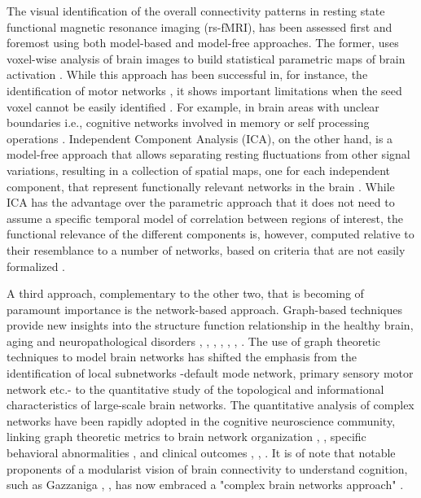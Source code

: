 \documentclass[12pt,a4paper]{article}
\begin{document}
The visual identification of the
overall connectivity patterns in resting state functional magnetic resonance
imaging (rs-fMRI), has been assessed first and foremost using both model-based and model-free
approaches. The former, uses voxel-wise analysis of brain images to build statistical parametric maps of brain activation \cite{biswal_functional_1995}. 
While this approach has been successful in, for instance, 
the identification of motor networks \cite{robinson_resting_2009}, it shows important limitations when
the seed voxel cannot be easily identified \cite{maldjian_functional_2001}.  
For example, in brain areas with unclear boundaries i.e., cognitive networks involved in memory or self processing operations \cite{fingelkurts_persistent_2011}. 
Independent Component Analysis (ICA), on
the other hand, is a model-free approach that allows separating resting
fluctuations from other signal variations, resulting in a collection of spatial
maps, one for each independent component, that represent functionally relevant networks in the brain
\cite{calhoun_review_2009}.
While ICA has the advantage over the parametric approach that it does not need to
assume a specific temporal model of correlation between regions of
interest, the functional relevance of the different components is, however,
computed relative to their resemblance to a number of networks, based on
criteria that are not easily formalized \cite{biswal_toward_2010}.

A third approach, complementary to the other two, that is becoming of paramount importance is the network-based approach. Graph-based techniques provide new
insights into the structure function relationship in the healthy brain, aging and neuropathological disorders \cite{fair_functional_2009}, 
\cite{wang_graph-based_2010}, \cite{he_graph_2010}, \cite{wang_graph_2011}, \cite{yu_altered_2011}, \cite{brier_functional_2014}, \cite{sala-llonch_changes_2014}. 
The use of graph theoretic techniques to model brain networks has shifted the 
emphasis from the identification of local subnetworks -default mode network,
primary sensory motor network etc.- to the quantitative study of the topological
and informational characteristics of large-scale brain networks.
The quantitative analysis of complex networks have been rapidly adopted in the cognitive neuroscience community, linking graph theoretic metrics  to brain network organization \cite{bullmore_complex_2009}, \cite{sporns_contributions_2014},  specific behavioral abnormalities \cite{tschernegg_abnormalities_2013}, \cite{cocchi_functional_2012} and  clinical outcomes \cite{yuan_structural_2015}, \cite{anderson_abnormal_2013}, \cite{dickerson_large-scale_2009} . It is of note that notable proponents of a modularist vision of brain
connectivity to understand cognition, such as Gazzaniga
\cite{gazzaniga_new_1999}, \cite{Fuster:2000}, has
now embraced a "complex brain networks approach" \cite{bassett_understanding_2011}. 
\end{document}
